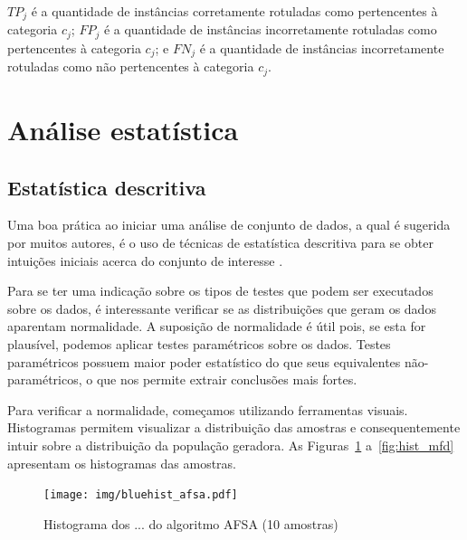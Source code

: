 \documentclass[conference]{IEEEtran}
\begin{document}
$TP_j$ é a quantidade de instâncias corretamente rotuladas como pertencentes à categoria $c_j$; $FP_j$ é a quantidade de instâncias incorretamente rotuladas como pertencentes à categoria $c_j$; e $FN_j$ é a quantidade de instâncias incorretamente rotuladas como não pertencentes à categoria $c_j$. 

\section{Análise estatística}
\label{sec:analise}

\subsection{Estatística descritiva}

Uma boa prática ao iniciar uma análise de conjunto de dados, a qual é sugerida por muitos autores, é o uso de técnicas de estatística descritiva para se obter intuições iniciais acerca do conjunto de interesse \cite{montgomery2010applied}.

Para se ter uma indicação sobre os tipos de testes que podem ser executados sobre os dados, é interessante verificar se as distribuições que geram os dados aparentam normalidade.
A suposição de normalidade é útil pois, se esta for plausível, podemos aplicar testes paramétricos sobre os dados.
Testes paramétricos possuem maior poder estatístico do que seus equivalentes não-paramétricos, o que nos permite extrair conclusões mais fortes.

Para verificar a normalidade, começamos utilizando ferramentas visuais.
Histogramas permitem visualizar a distribuição das amostras e consequentemente intuir sobre a distribuição da população geradora.
As Figuras~\ref{fig:hist_afsa} a~\ref{fig:hist_mfd} apresentam os histogramas das amostras.

\begin{figure}[h]
	\centering
	\texttt{[image: img/bluehist\_afsa.pdf]}
	\caption{Histograma dos ... do algoritmo AFSA (10 amostras)}
	\label{fig:hist_afsa}
\end{figure}
\end{document}
